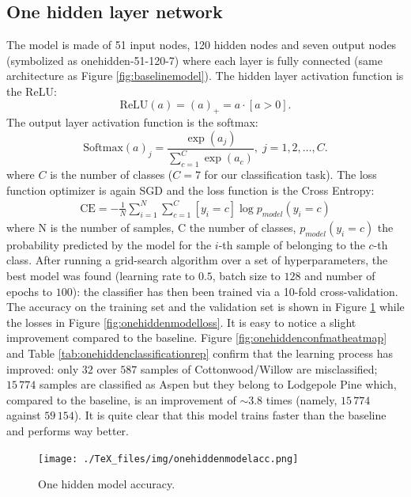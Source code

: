 \subsection{One hidden layer network}
\label{sec:onehidden}
The model is made of 51 input nodes, 120 hidden nodes and seven output nodes (symbolized as onehidden-51-120-7) where each layer is fully connected (same architecture as Figure \ref{fig:baselinemodel}). The hidden layer activation function is the ReLU:
\begin{equation}
\text{ReLU}(a) = (a)_+ = a\cdot[a>0].
\end{equation}
The output layer activation function is the softmax:
\begin{equation}
\text{Softmax}(a)_j = \frac{\exp(a_j)}{\sum_{c=1}^{C} \exp(a_c)}, \; j = 1,2,\dots,C.
\end{equation}
where $C$ is the number of classes ($C=7$ for our classification task). The loss function optimizer is again SGD and the loss function is the Cross Entropy:
\begin{equation}
\begin{aligned}
\text{CE} = - \frac{1}{N} \sum_{i=1}^{N}\sum_{c=1}^{C} [y_i = c] \log p_{model}(y_i = c)
\end{aligned}
\end{equation}
where N is the number of samples, C the number of classes, $p_{model}(y_i = c)$ the probability predicted by the model for the $i$-th sample of belonging to the $c$-th class. After running a grid-search algorithm over a set of hyperparameters, the best model was found (learning rate to $0.5$, batch size to $128$ and number of epochs to $100$): the classifier has then been trained via a 10-fold cross-validation. The accuracy on the training set and the validation set is shown in Figure \ref{fig:onehiddenmodelacc} while the losses in Figure \ref{fig:onehiddenmodelloss}. It is easy to notice a slight improvement compared to the baseline. Figure \ref{fig:onehiddenconfmatheatmap} and Table \ref{tab:onehiddenclassificationrep} confirm that the learning process has improved: only $32$ over $587$ samples of Cottonwood/Willow are misclassified; $15\,774$ samples are classified as Aspen but they belong to Lodgepole Pine which, compared to the baseline, is an improvement of $\sim3.8$ times (namely, $15\,774$ against $59\,154$). It is quite clear that this model trains faster than the baseline and performs way better.
\begin{figure}
\centering
\texttt{[image: ./TeX\_files/img/onehiddenmodelacc.png]}
\caption{One hidden model accuracy.}
\label{fig:onehiddenmodelacc}
\end{figure}

